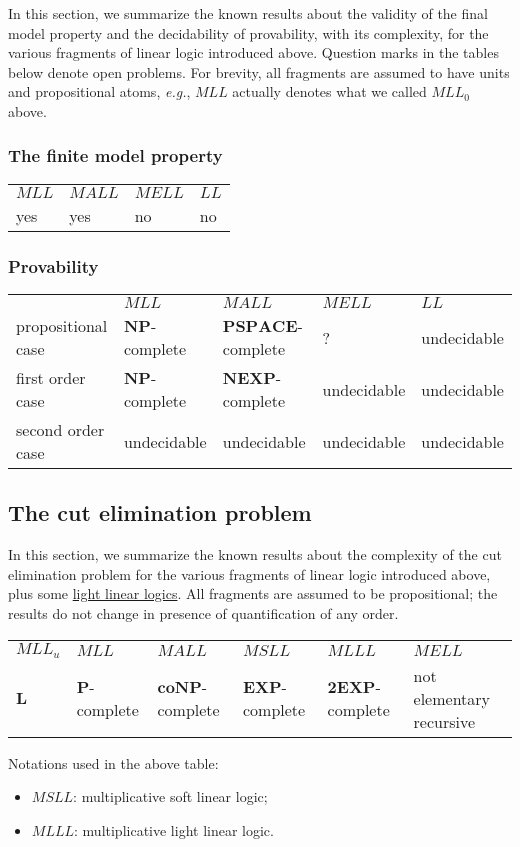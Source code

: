 In this section, we summarize the known results about the validity of
the final model property and the decidability of provability, with its
complexity, for the various fragments of linear logic introduced above.
Question marks in the tables below denote open problems. For brevity,
all fragments are assumed to have units and propositional atoms,
\emph{e.g.}, \(MLL\) actually denotes what we called \(MLL_0\) above.

\subsubsection{The finite model
property}\label{the-finite-model-property}

\begin{longtable}[]{@{}llll@{}}
\toprule
\(MLL\) & \(MALL\) & \(MELL\) & \(LL\)\tabularnewline
yes & yes & no & no\tabularnewline
\bottomrule
\end{longtable}

\subsubsection{Provability}\label{provability}

\begin{longtable}[]{@{}lllll@{}}
\toprule
& \(MLL\) & \(MALL\) & \(MELL\) & \(LL\)\tabularnewline
propositional case & \(\mathbf{NP}\)-complete &
\(\mathbf{PSPACE}\)-complete & ? & undecidable\tabularnewline
first order case & \(\mathbf{NP}\)-complete & \(\mathbf{NEXP}\)-complete
& undecidable & undecidable\tabularnewline
second order case & undecidable & undecidable & undecidable &
undecidable\tabularnewline
\bottomrule
\end{longtable}

\subsection{The cut elimination
problem}\label{the-cut-elimination-problem}

In this section, we summarize the known results about the complexity of
the cut elimination problem for the various fragments of linear logic
introduced above, plus some \href{light_linear_logics}{light linear
logics}. All fragments are assumed to be propositional; the results do
not change in presence of quantification of any order.

\begin{longtable}[]{@{}llllll@{}}
\toprule
\(MLL_u\) & \(MLL\) & \(MALL\) & \(MSLL\) & \(MLLL\) &
\(MELL\)\tabularnewline
\(\mathbf L\) & \(\mathbf{P}\)-complete & \(\mathbf{coNP}\)-complete &
\(\mathbf{EXP}\)-complete & \(\mathbf{2EXP}\)-complete & not elementary
recursive\tabularnewline
\bottomrule
\end{longtable}

Notations used in the above table:

\begin{itemize}
\tightlist
\item
  \(MSLL\): multiplicative soft linear logic;
\item
  \(MLLL\): multiplicative light linear logic.
\end{itemize}

